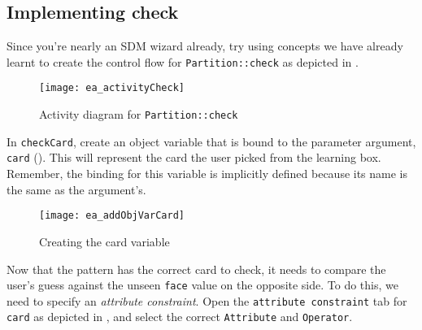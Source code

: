 \newpage
\hypertarget{checkCard vis}{}
\subsection{Implementing check}
\label{sec: Implementing check}
\genHeader

\begin{stepbystep}

\vspace{1cm}

\item Since you're nearly an SDM wizard already, try using concepts we have already learnt to create the control flow for
\texttt{Partition::check} as depicted in .

\vspace{1cm}

\begin{figure}[htbp]
\begin{center}
  \texttt{[image: ea\_activityCheck]}
  \caption{Activity diagram for \texttt{Partition::check}}
  \label{ea:sdm_check_start}
\end{center}
\end{figure}

\vspace{1cm}

\item In \texttt{checkCard}, create an object variable that is bound to the parameter argument, \texttt{card} 
(). This will represent the card the user picked from the learning box. Remember, the binding for this variable is implicitly
defined because its name is the same as the argument's.

\begin{figure}[htbp]
\begin{center}
  \texttt{[image: ea\_addObjVarCard]}
  \caption{Creating the card variable}
  \label{ea:sdm_check_addCard}
\end{center}
\end{figure}

\clearpage

\item Now that the pattern has the correct card to check, it needs to compare the user's guess against the unseen \texttt{face} value on
the opposite side. To do this, we need to specify an \emph{attribute constraint}. Open the \texttt{attribute constraint} tab for \texttt{card} as depicted in
, and select the correct \texttt{Attribute} and \texttt{Operator}.


\end{stepbystep}
